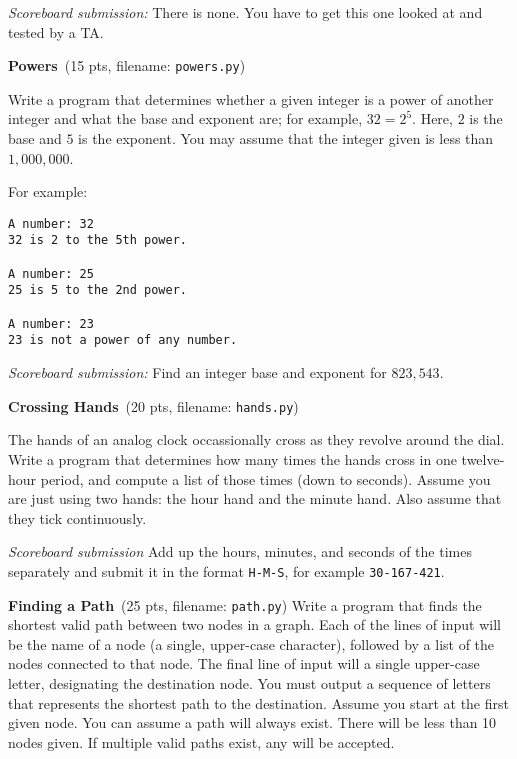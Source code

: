 \documentclass[11pt]{cselabheader}
\newcommand{\cop}[3]{\textbf{#1}~(#2 pts, filename: \texttt{#3})\quad}
\theoremstyle{plain}
\begin{document}
\begin{enumerate}
		\textit{Scoreboard submission:} There is none. You have to get this one
		looked at and tested by a TA.

	\item \cop{Powers}{15}{powers.py}

		Write a program that determines whether a given integer is a power of
		another integer and what the base and exponent are; for example, $32 = 
		2^5$. Here, $2$ is the base and $5$ is the exponent. You may assume 
		that the integer given is less than $1,000,000$. 

		For example:
		\begin{lstlisting}[style=bash]
A number: 32
32 is 2 to the 5th power.

A number: 25
25 is 5 to the 2nd power.

A number: 23
23 is not a power of any number.
		\end{lstlisting}

		\textit{Scoreboard submission:} Find an integer base and exponent for 
		$823,543$. %


        \item \cop{Crossing Hands}{20}{hands.py}

		The hands of an analog clock occassionally cross as they revolve around
		the dial. Write a program that determines how many times the hands
		cross in one twelve-hour period, and compute a list of those times
		(down to seconds). Assume you are just using two hands: the hour hand 
		and the minute hand. Also assume that they tick continuously.

		\textit{Scoreboard submission} Add up the hours, minutes, and seconds
		of the times separately and submit it in the format \texttt{H-M-S}, 
		for example \texttt{30-167-421}.

        \item \cop{Finding a Path}{25}{path.py}
          Write a program that finds the shortest valid path between two nodes in a graph.
          Each of the lines of input will be the name of a node (a single, upper-case
          character), followed by a list of the nodes connected to that node. The final
          line of input will a single upper-case letter, designating the destination node.
          You must output a sequence of letters that represents the shortest path to the
          destination. Assume you start at the first given node. You can assume a path will
          always exist. There will be less than 10 nodes given. If multiple valid paths
          exist, any will be accepted.
          

\end{enumerate}
\end{document}
